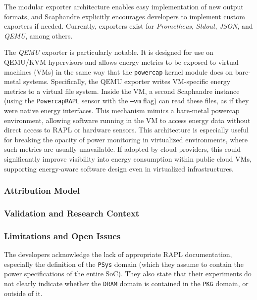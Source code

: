 The modular exporter architecture enables easy implementation of new output formats, and Scaphandre explicitly encourages developers to implement custom exporters if needed. Currently, exporters exist for \textit{Prometheus}, \textit{Stdout}, \textit{JSON}, and \textit{QEMU}, among others.

The \textit{QEMU} exporter is particularly notable. It is designed for use on QEMU/KVM hypervisors and allows energy metrics to be exposed to virtual machines (VMs) in the same way that the \texttt{powercap} kernel module does on bare-metal systems. Specifically, the QEMU exporter writes VM-specific energy metrics to a virtual file system. Inside the VM, a second Scaphandre instance (using the \texttt{PowercapRAPL} sensor with the \texttt{--vm} flag) can read these files, as if they were native energy interfaces. This mechanism mimics a bare-metal powercap environment, allowing software running in the VM to access energy data without direct access to RAPL or hardware sensors. This architecture is especially useful for breaking the opacity of power monitoring in virtualized environments, where such metrics are usually unavailable. If adopted by cloud providers, this could significantly improve visibility into energy consumption within public cloud VMs, supporting energy-aware software design even in virtualized infrastructures.

\subsubsection{Attribution Model}
\label{sec:scaphandre-attribution}

















\subsubsection{Validation and Research Context}
\label{sec:scaphandre-validation}
\subsubsection{Limitations and Open Issues}
\label{sec:scaphandre-limitations}
The developers acknowledge the lack of appropriate RAPL documentation, especially the definition of the \texttt{PSys} domain (which they assume to contain the power specifications of the entire SoC). They also state that their experiments do not clearly indicate whether the \texttt{DRAM} domain is contained in the \texttt{PKG} domain, or outside of it.


